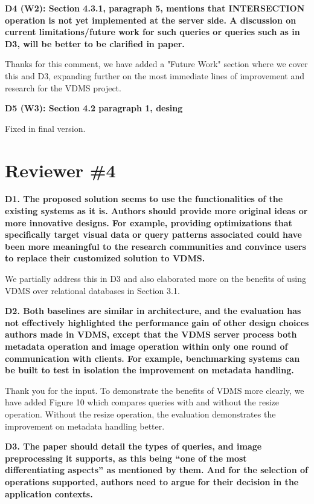 \documentclass[11pt]{proposalnsf}
\begin{document}
\bigskip
\textbf{
D4 (W2): Section 4.3.1, paragraph 5, mentions that INTERSECTION operation is not
yet implemented at the server side.
A discussion on current limitations/future work for such queries or queries
such as in D3, will be better to be clarified in paper.
}\bigskip

Thanks for this comment, we have added a "Future Work" section where we cover
this and D3, expanding further on the most immediate lines of
improvement and research for the VDMS project.

\bigskip
\textbf{
D5 (W3): Section 4.2 paragraph 1, desing
}\bigskip

Fixed in final version.

\bigskip

\newpage
\section{Reviewer \#4}

\bigskip
\textbf{
D1. The proposed solution seems to use the functionalities of the existing systems as it is. Authors should provide more original ideas or more innovative designs. For example, providing optimizations that specifically target visual data or query patterns associated could have been more meaningful to the research communities and convince users to replace their customized solution to VDMS.
}\bigskip

We partially address this in D3 and also elaborated more on the benefits of using VDMS over relational databases in Section 3.1.

\bigskip
\textbf{
D2. Both baselines are similar in architecture, and the evaluation has not effectively highlighted the performance gain of other design choices authors made in VDMS, except that the VDMS server process both metadata operation and image operation within only one round of communication with clients. For example, benchmarking systems can be built to test in isolation the improvement on metadata handling.
}\bigskip

Thank you for the input. To demonstrate the benefits of VDMS more clearly, we have added Figure 10 which compares queries with and without the resize operation.  Without the resize operation, the evaluation demonstrates the improvement on metadata handling better.

\bigskip
\textbf{
D3. The paper should detail the types of queries, and image preprocessing it supports, as this being “one of the most differentiating aspects” as mentioned by them. And for the selection of operations supported, authors need to argue for their decision in the application contexts.
}\bigskip
\end{document}
